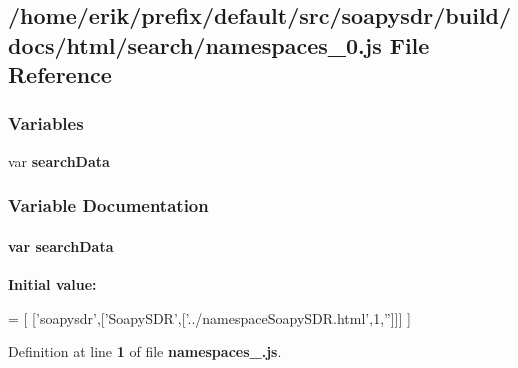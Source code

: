 \subsection{/home/erik/prefix/default/src/soapysdr/build/docs/html/search/namespaces\+\_\+0.js File Reference}
\label{namespaces__0_8js}
\subsubsection*{Variables}
\begin{DoxyCompactItemize}
\item 
var {\bf search\+Data}
\end{DoxyCompactItemize}


\subsubsection{Variable Documentation}
\paragraph[{search\+Data}]{\setlength{\rightskip}{0pt plus 5cm}var search\+Data}\label{namespaces__0_8js_ad01a7523f103d6242ef9b0451861231e}
{\bfseries Initial value\+:}
\begin{DoxyCode}
=
[
  [\textcolor{stringliteral}{'soapysdr'},[\textcolor{stringliteral}{'SoapySDR'},[\textcolor{stringliteral}{'../namespaceSoapySDR.html'},1,\textcolor{stringliteral}{''}]]]
]
\end{DoxyCode}


Definition at line {\bf 1} of file {\bf namespaces\+\_.\+js}.

